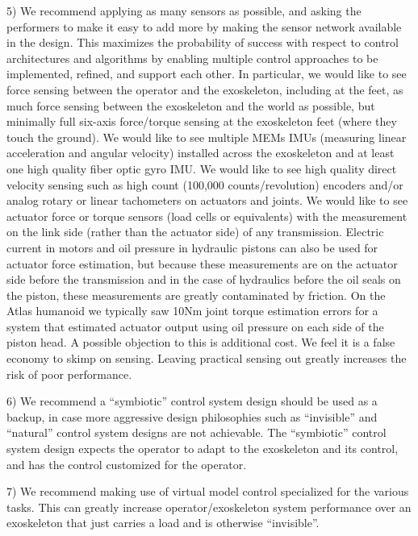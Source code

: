 \documentclass[letterpaper,12pt,fullpage]{article}
\begin{document}
5) We recommend applying as many sensors as possible, and asking the performers
to make it easy to add more by making the sensor network available in the design.
This maximizes the probability of success
with respect to control architectures and algorithms by enabling multiple control
approaches to be implemented, refined, and support each other.
In particular, we would like to see force sensing between the operator and the
exoskeleton, including at the feet, as much force sensing between the exoskeleton 
and the world as possible, but minimally full six-axis force/torque sensing at
the exoskeleton feet (where they touch the ground). We would like to see multiple MEMs
IMUs (measuring linear acceleration and angular velocity) installed across 
the exoskeleton and at least one high quality fiber optic gyro IMU. 
We would like to see high quality direct velocity sensing
such as high count (100,000 counts/revolution) encoders and/or 
analog rotary or linear tachometers on actuators and joints. 
We would like to see actuator force or torque sensors
(load cells or equivalents) with the measurement on the link side (rather than
the actuator side) of any transmission. Electric current in motors and oil
pressure in hydraulic pistons can also be used for actuator force estimation,
but because these measurements are on the actuator side before the transmission
and in the case of hydraulics before the oil seals on the piston, these measurements
are greatly contaminated by friction. On the Atlas humanoid we typically saw 10Nm
joint torque estimation errors for a system that estimated actuator output using
oil pressure on each side of the piston head.
A possible objection to this is additional cost. We feel it is a false
economy to skimp on sensing. Leaving practical sensing out greatly increases
the risk of poor performance.

6) We recommend a ``symbiotic'' control system design should be used as a backup,
in case more aggressive design philosophies such as ``invisible'' and ``natural''
control system designs are not achievable.
The ``symbiotic'' control system design
expects the operator to adapt to the exoskeleton and its control,
and has the control customized for the operator.

7) We recommend making use of virtual model control specialized
for the various tasks. This can greatly increase operator/exoskeleton system
performance over an exoskeleton that just carries a load and is otherwise
``invisible''.

%
%
\end{document}
